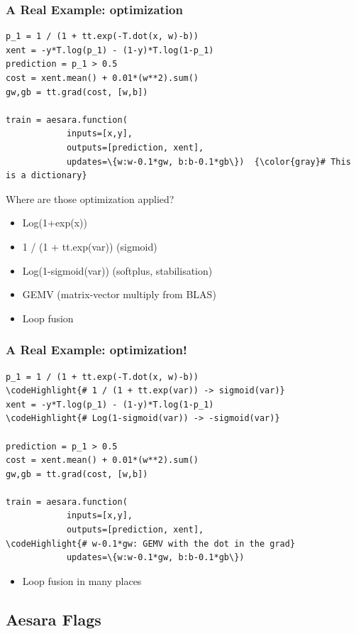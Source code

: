 \documentclass[a4paper,9pt]{beamer}
\begin{document}
\begin{frame}[fragile]
  \frametitle{A Real Example: optimization}
\begin{Verbatim}[commandchars=\\\{\}]
p_1 = 1 / (1 + tt.exp(-T.dot(x, w)-b))
xent = -y*T.log(p_1) - (1-y)*T.log(1-p_1)
prediction = p_1 > 0.5
cost = xent.mean() + 0.01*(w**2).sum()
gw,gb = tt.grad(cost, [w,b])

train = aesara.function(
            inputs=[x,y],
            outputs=[prediction, xent],
            updates=\{w:w-0.1*gw, b:b-0.1*gb\})  {\color{gray}# This is a dictionary}
\end{Verbatim}
Where are those optimization applied?
\begin{itemize}
\item Log(1+exp(x))
\item 1 / (1 + tt.exp(var)) (sigmoid)
\item Log(1-sigmoid(var)) (softplus, stabilisation)
\item GEMV (matrix-vector multiply from BLAS)
\item Loop fusion
\end{itemize}
\end{frame}

\begin{frame}[fragile]
  \frametitle{A Real Example: optimization!}
\begin{Verbatim}[commandchars=\\\{\}]
p_1 = 1 / (1 + tt.exp(-T.dot(x, w)-b))
\codeHighlight{# 1 / (1 + tt.exp(var)) -> sigmoid(var)}
xent = -y*T.log(p_1) - (1-y)*T.log(1-p_1)
\codeHighlight{# Log(1-sigmoid(var)) -> -sigmoid(var)}

prediction = p_1 > 0.5
cost = xent.mean() + 0.01*(w**2).sum()
gw,gb = tt.grad(cost, [w,b])

train = aesara.function(
            inputs=[x,y],
            outputs=[prediction, xent],
\codeHighlight{# w-0.1*gw: GEMV with the dot in the grad}
            updates=\{w:w-0.1*gw, b:b-0.1*gb\})

\end{Verbatim}
\begin{itemize}
\item Loop fusion in many places
\end{itemize}
\end{frame}

\subsection{Aesara Flags}
\end{document}
